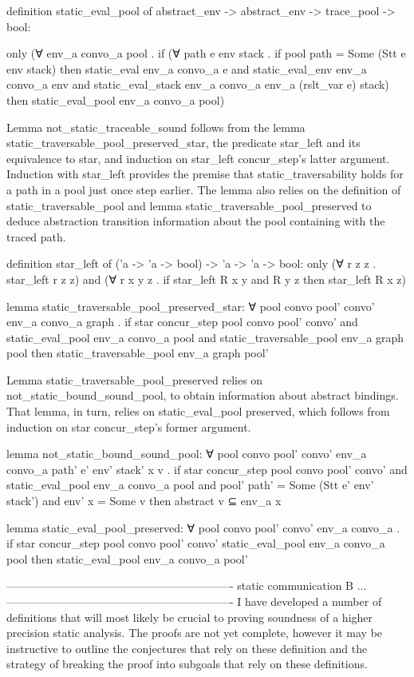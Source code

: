 \documentclass{article}
\begin{document}
definition static_eval_pool of abstract_env -> abstract_env -> trace_pool -> bool:

only
(∀ env_a convo_a pool .
  if
    (∀ path e env stack . if pool path = Some (Stt e env stack) then 
      static_eval env_a convo_a e and
      static_eval_env env_a convo_a env and
      static_eval_stack env_a convo_a env_a (rslt_var e) stack)
  then 
    static_eval_pool env_a convo_a pool)

Lemma not_static_traceable_sound follows from the lemma 
static_traversable_pool_preserved_star, the predicate star_left and its equivalence to star,
and induction on star_left concur_step's latter argument.  Induction with star_left provides
the premise that static_traversability holds for a path in a pool just once step earlier. The
lemma also relies on the definition of static_traversable_pool and lemma
static_traversable_pool_preserved to deduce abstraction transition information about the pool
containing with the traced path.  


definition star_left of ('a -> 'a -> bool) -> 'a -> 'a -> bool:
only
(∀ r z z . star_left r z z) and
(∀ r x y z .
  if
    star_left R x y and R y z
  then
    star_left R x z)

lemma static_traversable_pool_preserved_star:
∀  pool convo pool' convo' env_a convo_a graph .
  if
    star concur_step pool convo pool' convo' and 
    static_eval_pool env_a convo_a pool and
    static_traversable_pool env_a graph pool
  then
    static_traversable_pool env_a graph pool' 


Lemma static_traversable_pool_preserved relies on not_static_bound_sound_pool,
to obtain information about abstract bindings.  That lemma, in turn, relies on static_eval_pool
preserved, which follows from induction on star concur_step's former argument.


lemma not_static_bound_sound_pool:
∀ pool convo pool' convo' env_a convo_a path' e' env' stack' x v .
  if
    star concur_step pool convo pool' convo' and 
    static_eval_pool env_a convo_a pool and 
    pool' path' = Some (Stt e' env' stack') and 
    env' x = Some v 
  then
    {abstract v} ⊆ env_a x


lemma static_eval_pool_preserved:
∀ pool convo pool' convo' env_a convo_a .
  if
    star concur_step pool convo pool' convo' 
    static_eval_pool env_a convo_a pool
  then
    static_eval_pool env_a convo_a pool'


-------------------------------------------------------------
static communication B ...
-------------------------------------------------------------
I have developed a number of definitions that will most likely be crucial to proving soundness
of a higher precision static analysis.  The proofs are not yet complete, however it may be
instructive to outline the conjectures that rely on these definition and the strategy of
breaking the proof into subgoals that rely on these definitions.
\end{document}
